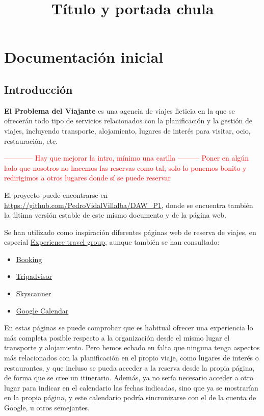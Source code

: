 \documentclass[11pt, a4paper]{book}
\title{Título y portada chula}
\begin{document}
	\maketitle
	
	\tableofcontents
	\newpage
	\thispagestyle{empty}
	
	\chapter{Documentación inicial}
	
	\section{Introducción}
	\textbf{El Problema del Viajante} es una agencia de viajes ficticia en la que se ofrecerán todo tipo de servicios relacionados con la planificación y la gestión de viajes, incluyendo transporte, alojamiento, lugares de interés para visitar, ocio, restauración, etc.
	
	\textcolor{red}{------------ Hay que mejorar la intro, mínimo una carilla ---------}
	\textcolor{red}{Poner en algún lado que nosotros no hacemos las reservas como tal, solo lo ponemos bonito y redirigimos a otros lugares donde sí se puede reservar}
	
	El proyecto puede encontrarse en \href{https://github.com/PedroVidalVillalba/DAW_P1}{https://github.com/PedroVidalVillalba/DAW\_P1}, donde se encuentra también la última versión estable de este mismo documento y de la página web.
	
	
	Se han utilizado como inspiración diferentes páginas web de reserva de viajes, en especial \href{https://experiencetravelgroup.com}{Experience travel group}, aunque también se han consultado:
	\begin{itemize}
		\item \href{https://booking.com}{Booking}
		\item \href{https://tripadvisor.es}{Tripadvisor}
		\item \href{https://skyscanner.es}{Skyscanner}
		\item \href{https://calendar.google.com/calendar/u/0/r}{Google Calendar}
	\end{itemize}
	
	 En estas páginas se puede comprobar que es habitual ofrecer una experiencia lo más completa posible respecto a la organización desde el mismo lugar el transporte y alojamiento. Pero hemos echado en falta que ninguna tenga aspectos más relacionados con la planificación en el propio viaje, como lugares de interés o restaurantes, y que incluso se pueda acceder a la reserva desde la propia página, de forma que se cree un itinerario. Además, ya no sería necesario acceder a otro lugar para indicar en el calendario las fechas indicadas, sino que ya se mostrarían en la propia página, y este calendario podría sincronizarse con el de la cuenta de Google, u otros semejantes.
	
\end{document}
